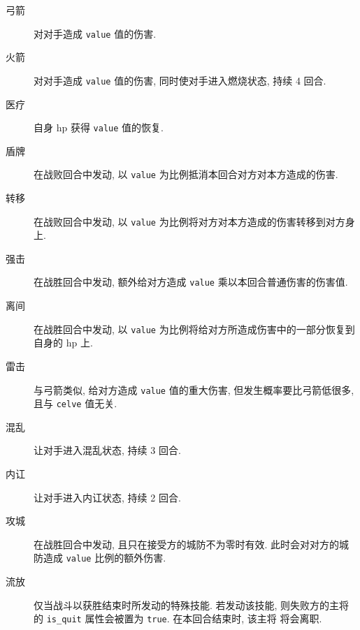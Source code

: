 \documentclass[UTF8, zihao=-4]{ctexart} %
\newcommand{\lcode}{\lstinline} % 段内插入代码
\begin{document}
\begin{description}
    \item [弓箭] 对对手造成 \lcode{value} 值的伤害.
    \item [火箭] 对对手造成 \lcode{value} 值的伤害, 同时使对手进入燃烧状态, 持续 4 回合.
    \item [医疗] 自身 hp 获得 \lcode{value} 值的恢复.
    \item [盾牌] 在战败回合中发动, 以 \lcode{value} 为比例抵消本回合对方对本方造成的伤害.
    \item [转移] 在战败回合中发动, 以 \lcode{value} 为比例将对方对本方造成的伤害转移到对方身上.
    \item [强击] 在战胜回合中发动, 额外给对方造成 \lcode{value} 乘以本回合普通伤害的伤害值.
    \item [离间] 在战胜回合中发动, 以 \lcode{value} 为比例将给对方所造成伤害中的一部分恢复到自身的 hp 上.
    \item [雷击] 与弓箭类似, 给对方造成 \lcode{value} 值的重大伤害, 但发生概率要比弓箭低很多, 且与 \lcode{celve} 值无关.
    \item [混乱] 让对手进入混乱状态, 持续 3 回合. 
    \item [内讧] 让对手进入内讧状态, 持续 2 回合.
    \item [攻城] 在战胜回合中发动, 且只在接受方的城防不为零时有效. 此时会对对方的城防造成 \lcode{value} 比例的额外伤害.
    \item [流放] 仅当战斗以获胜结束时所发动的特殊技能. 若发动该技能, 则失败方的主将
        的 \lcode{is_quit} 属性会被置为 \lcode{true}. 在本回合结束时, 该主将
        将会离职.
\end{description}
\end{document}
